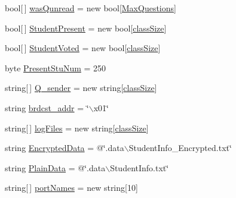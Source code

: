 \begin{DoxyCompactItemize}
bool\mbox{[}$\,$\mbox{]} \hyperlink{class_sr_p___classroom_inq_1_1frm_classrrom_inq_adc405f927295c61b4675a8b28142c645}{was\-Qunread} = new bool\mbox{[}\hyperlink{class_sr_p___classroom_inq_1_1frm_classrrom_inq_abbcb6a4a2ba214bc7aab16386f0e8c98}{\-Max\-Questions}\mbox{]}
\item 
bool\mbox{[}$\,$\mbox{]} \hyperlink{class_sr_p___classroom_inq_1_1frm_classrrom_inq_aa5c7b55e4b30e09f574c44e90b06e7b2}{\-Student\-Present} = new bool\mbox{[}\hyperlink{class_sr_p___classroom_inq_1_1frm_classrrom_inq_a78d9aab335edfe53d39036b9d89928a8}{class\-Size}\mbox{]}
\item 
bool\mbox{[}$\,$\mbox{]} \hyperlink{class_sr_p___classroom_inq_1_1frm_classrrom_inq_a1a7e4f2ef2b99a4a641431918fedf7f5}{\-Student\-Voted} = new bool\mbox{[}\hyperlink{class_sr_p___classroom_inq_1_1frm_classrrom_inq_a78d9aab335edfe53d39036b9d89928a8}{class\-Size}\mbox{]}
\item 
byte \hyperlink{class_sr_p___classroom_inq_1_1frm_classrrom_inq_ad5da56ffdb5d79486d9cf4eb7c3f44d4}{\-Present\-Stu\-Num} = 250
\item 
string\mbox{[}$\,$\mbox{]} \hyperlink{class_sr_p___classroom_inq_1_1frm_classrrom_inq_afa4b6c4601d48db676d4013daef6624c}{\-Q\-\_\-sender} = new string\mbox{[}\hyperlink{class_sr_p___classroom_inq_1_1frm_classrrom_inq_a78d9aab335edfe53d39036b9d89928a8}{class\-Size}\mbox{]}
\item 
string \hyperlink{class_sr_p___classroom_inq_1_1frm_classrrom_inq_a1d96e40e37aca536a94b7107df4a2d71}{brdcst\-\_\-addr} = \char`\"{}$\backslash$x01\char`\"{}
\item 
string\mbox{[}$\,$\mbox{]} \hyperlink{class_sr_p___classroom_inq_1_1frm_classrrom_inq_a1b23b6935997df29f1b06ed831495076}{log\-Files} = new string\mbox{[}\hyperlink{class_sr_p___classroom_inq_1_1frm_classrrom_inq_a78d9aab335edfe53d39036b9d89928a8}{class\-Size}\mbox{]}
\item 
string \hyperlink{class_sr_p___classroom_inq_1_1frm_classrrom_inq_a3128c84ccd476a8a2e02bedab0ecc031}{\-Encrypted\-Data} = @\char`\"{}.data$\backslash$\-Student\-Info\-\_\-\-Encrypted.\-txt\char`\"{}
\item 
string \hyperlink{class_sr_p___classroom_inq_1_1frm_classrrom_inq_a511d08cf3bdc5282be448f0513bbd262}{\-Plain\-Data} = @\char`\"{}.data$\backslash$\-Student\-Info.\-txt\char`\"{}
\item 
string\mbox{[}$\,$\mbox{]} \hyperlink{class_sr_p___classroom_inq_1_1frm_classrrom_inq_a9c5b06a44069e68e732d7bcd7a8fa08c}{port\-Names} = new string\mbox{[}10\mbox{]}

\end{DoxyCompactItemize}
